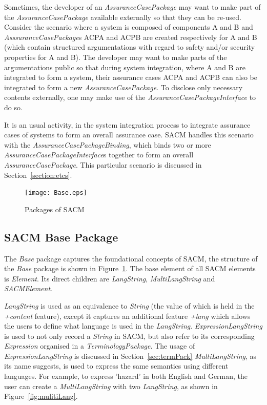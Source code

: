 Sometimes, the developer of an \textit{AssuranceCasePackage} may want to make part of the \textit{AssuranceCasePackage} available externally so that they can be re-used. Consider the scenario where a system is composed of components A and B and \textit{AsssuranceCasePackage}s ACPA and ACPB are created respectively for A and B (which contain structured argumentations with regard to safety and/or security properties for A and B). The developer may want to make parts of the argumentations public so that during system integration, where A and B are integrated to form a system, their assurance cases ACPA and ACPB can also be integrated to form a new \textit{AssuranceCasePackage}. To disclose only necessary contents externally, one may make use of the \textit{AssuranceCasePackageInterface} to do so. 

It is an usual activity, in the system integration process to integrate assurance cases of systems to form an overall assurance case. SACM handles this scenario with the \textit{AssuranceCasePackageBinding}, which binds two or more \textit{AssuranceCasePackageInterface}s together to form an overall \textit{AssuranceCasePackage}. This particular scenario is discussed in Section~\ref{section:etcs}.
\begin{figure}
	\centering
	\texttt{[image: Base.eps]}
	\caption{Packages of SACM}
	\label{fig:base}
\end{figure}

\subsection{SACM Base Package}
\label{sec:basePack}

The \textit{Base} package captures the foundational concepts of SACM, the structure of the \textit{Base} package is shown in Figure~\ref{fig:base}. The base element of all SACM elements is \textit{Element}. Its direct children are \textit{LangString}, \textit{MultiLangString} and \textit{SACMElement}.

\textit{LangString} is used as an equivalence to \textit{String} (the value of which is held in the \textit{+content} feature), except it captures an additional feature \textit{+lang} which allows the users to define what language is used in the \textit{LangString}. \textit{ExpressionLangString} is used to not only record a \textit{String} in SACM, but also refer to its corresponding \textit{Expression} organised in a \textit{TerminologyPackage}. The usage of \textit{ExpressionLangString} is discussed in Section~\ref{sec:termPack} \textit{MultiLangString}, as its name suggests, is used to express the same semantics using different languages. For example, to express 'hazard' in both English and German, the user can create a \textit{MultiLangString} with two \textit{LangString}, as shown in Figure~\ref{fig:mulitiLang}.

